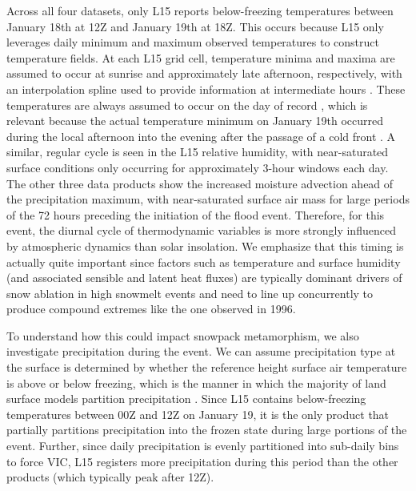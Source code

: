 \documentclass[nhess, manuscript]{copernicus}
\begin{document}
Across all four datasets, only L15 reports below-freezing temperatures between January 18th at 12Z and January 19th at 18Z.
This occurs because L15 only leverages daily minimum and maximum observed temperatures to construct temperature fields.
At each L15 grid cell, temperature minima and maxima are assumed to occur at sunrise and approximately late afternoon, respectively, with an interpolation spline used to provide information at intermediate hours \citep{bohn2013global}.
These temperatures are always assumed to occur on the day of record \citep{livneh2015spatially}, which is relevant because the actual temperature minimum on January 19th occurred during the local afternoon into the evening after the passage of a cold front \citep{leathers1998severe}.
A similar, regular cycle is seen in the L15 relative humidity, with near-saturated surface conditions only occurring for approximately 3-hour windows each day. The other three data products show the increased moisture advection ahead of the precipitation maximum, with near-saturated surface air mass for large periods of the 72 hours preceding the initiation of the flood event.
Therefore, for this event, the diurnal cycle of thermodynamic variables is more strongly influenced by atmospheric dynamics than solar insolation.
We emphasize that this timing is actually quite important since factors such as temperature and surface humidity (and associated sensible and latent heat fluxes) are typically dominant drivers of snow ablation in high snowmelt events \citep{mazurkiewicz2008assessing,wurzer2016influence,harpold2018humidity} and need to line up concurrently to produce compound extremes like the one observed in 1996.

To understand how this could impact snowpack metamorphism, we also investigate precipitation during the event.
We can assume precipitation type at the surface is determined by whether the reference height surface air temperature is above or below freezing, which is the manner in which the majority of land surface models partition precipitation \citep{harpold2017rain,jennings2018spatial,Woodburn2021}.
Since L15 contains below-freezing temperatures between 00Z and 12Z on January 19, it is the only product that partially partitions precipitation into the frozen state during large portions of the event.
Further, since daily precipitation is evenly partitioned into sub-daily bins to force VIC, L15 registers more precipitation during this period than the other products (which typically peak after 12Z).
\end{document}
